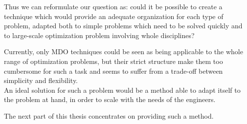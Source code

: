 Thus we can reformulate our question as: could it be possible to create a technique which would provide an adequate organization for each type of problem, adapted both to simple problems which need to be solved quickly and to large-scale optimization problem involving whole disciplines?

Currently, only MDO techniques could be seen as being applicable to the whole range of optimization problems, but their strict structure make them too cumbersome for such a task and seems to suffer from a trade-off between simplicity and flexibility.\\
An ideal solution for such a problem would be a method able to adapt itself to the problem at hand, in order to scale with the needs of the engineers.

The next part of this thesis concentrates on providing such a method.
